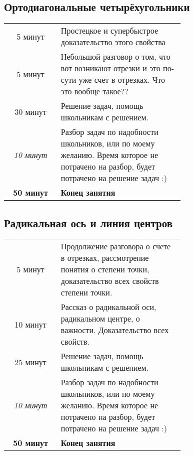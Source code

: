 \subsection{Ортодиагональные четырёхугольники}
\begin{center}
    \begin{tabular}{c | p{0.7\linewidth}}                
        5 минут & Простецкое и супербыстрое доказательство этого свойства \\ [3mm]
        
        5 минут & Небольшой разговор о том, что вот возникают отрезки и это по-сути уже счет в отрезках. Что это вообще такое?? \\ [3mm]
        
        30 минут & Решение задач, помощь школьникам с решением.\\ [3mm]
        
        \textit{10 минут} & Разбор задач по надобности школьников, или по моему желанию. Время которое не потрачено на разбор, будет потрачено на решение задач :)\\ [3mm]
        
        \hline 
        \textbf{50 минут} & \textbf{Конец занятия}
    \end{tabular}
\end{center}
\subsection{Радикальная ось и линия центров}
\begin{center}
    \begin{tabular}{c | p{0.7\linewidth}}                
        5 минут & Продолжение разговора о счете в отрезках, рассмотрение понятия о степени точки, доказательство всех свойств степени точки. \\ [3mm]

        10 минут & Рассказ о радикальной оси, радикальном центре, о важности. Доказательство всех свойств. \\ [3mm]
        
        25 минут & Решение задач, помощь школьникам с решением.\\ [3mm]
        
        \textit{10 минут} & Разбор задач по надобности школьников, или по моему желанию. Время которое не потрачено на разбор, будет потрачено на решение задач :)\\ [3mm]
        
        \hline
        \textbf{50 минут} & \textbf{Конец занятия}
    \end{tabular}
\end{center}

